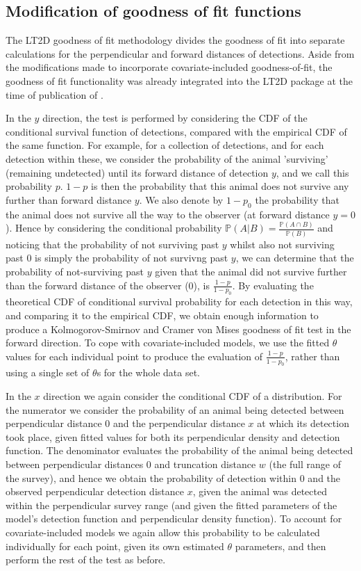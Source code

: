 \documentclass[11pt]{article}
\begin{document}
\begin{multicols}{2}
\subsection{Modification of goodness of fit functions}
The LT2D goodness of fit methodology divides the goodness of fit into separate calculations for the perpendicular and forward distances of detections. Aside from the modifications made to incorporate covariate-included goodness-of-fit, the goodness of fit functionality was already integrated into the LT2D package at the time of publication of \cite{Borchers}.

In the $y$ direction, the test is performed by considering the CDF of the conditional survival function of detections, compared with the empirical CDF of the same function. For example, for a collection of detections, and for each detection within these, we consider the probability of the animal 'surviving' (remaining undetected) until its forward distance of detection $y$, and we call this probability $p$. $1-p$ is then the probability that this animal does not survive any further than forward distance $y$. We also denote by $1-p_0$ the probability that the animal does not survive all the way to the observer (at forward distance $y=0$). Hence by          considering the conditional probability $\mathbb{P}\left(A|B\right) = \frac{\mathbb{P}\left(A\cap B\right)}{\mathbb{P}\left(B\right)}$ and noticing that the probability of not surviving past $y$ whilst also not surviving past $0$ is simply the probability of not survivng past $y$, we can determine that the probability of not-surviving past $y$ given that the animal did not survive further than the forward distance of the observer ($0$), is $\frac{1-p}{1-p_0}$. By evaluating the theoretical CDF of conditional survival probability for each detection in this way, and comparing it to the empirical CDF, we obtain enough information to produce a Kolmogorov-Smirnov and Cramer von Mises goodness of fit test in the forward direction. To cope with covariate-included models, we use the fitted $\theta$ values for each individual point to produce the evaluation of $\frac{1-p}{1-p_0}$, rather than using a single set of $\theta$s for the whole data set. 

In the $x$ direction we again consider the conditional CDF of a distribution. For the numerator we consider the probability of an animal being detected between perpendicular distance $0$ and the perpendicular distance $x$ at which its detection took place, given fitted values for both its perpendicular density and detection function. The denominator evaluates the probability of the animal being detected between perpendicular distances $0$ and truncation distance $w$ (the full range of the survey), and hence we obtain the probability of detection within $0$ and the observed perpendicular detection distance $x$, given the animal was detected within the perpendicular survey range (and given the fitted parameters of the model's detection function and perpendicular density function). To account for covariate-included models we again allow this probability to be calculated individually for each point, given its own estimated $\theta$ parameters, and then perform the rest of the test as before.


\end{multicols}
\end{document}
